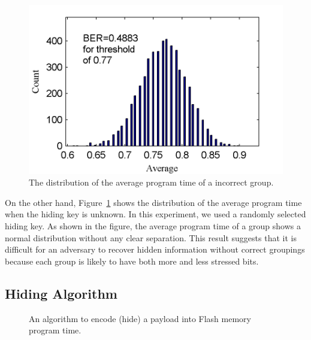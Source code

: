 \begin{figure} 
\begin{center} 
\includegraphics[width=\mywidth]{figs/5e3_histo_withoutkey.png} 
\caption{The distribution of the average program time of a incorrect group.}
\label{fig:withoutkey_10blocks} 
\vspace{-0.1in}
\end{center} 
\end{figure} 

On the other hand, Figure~\ref{fig:withoutkey_10blocks} shows the distribution
of the average program time when the hiding key is unknown. In this experiment,
we used a randomly selected hiding key. As shown in the figure, the average program
time of a group shows a normal distribution without any clear separation.
This result suggests that it is difficult for an adversary to recover hidden information 
without correct groupings because each group is likely to have both more and less
stressed bits.




\subsection{Hiding Algorithm}

\begin{figure} 
\begin{center} 
 
\caption{An algorithm to encode (hide) a payload into Flash memory program time.}
\label{fig:encodingalg} 
\vspace{-0.25in}
\end{center} 
\end{figure}

